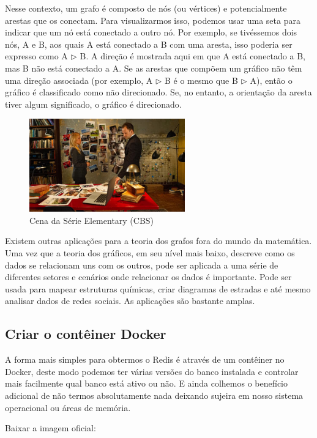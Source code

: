 \documentclass[a4paper,11pt]{article}
\begin{document}
Nesse contexto, um grafo é composto de nós (ou vértices) e potencialmente arestas que os conectam. Para visualizarmos isso, podemos usar uma seta para indicar que um nó está conectado a outro nó. Por exemplo, se tivéssemos dois nós, A e B, aos quais A está conectado a B com uma aresta, isso poderia ser expresso como A $\triangleright$ B. A direção é mostrada aqui em que A está conectado a B, mas B não está conectado a A. Se as arestas que compõem um gráfico não têm uma direção associada (por exemplo, A $\triangleright$ B é o mesmo que B $\triangleright$ A), então o gráfico é classificado como não direcionado. Se, no entanto, a orientação da aresta tiver algum significado, o gráfico é direcionado.
\begin{figure}[H]
	\centering
	\includegraphics[width=0.6\textwidth]{imagens/Elementary.jpg}
	\caption{Cena da Série Elementary (CBS)}
\end{figure}

Existem outras aplicações para a teoria dos grafos fora do mundo da matemática. Uma vez que a teoria dos gráficos, em seu nível mais baixo, descreve como os dados se relacionam uns com os outros, pode ser aplicada a uma série de diferentes setores e cenários onde relacionar os dados é importante. Pode ser usada para mapear estruturas químicas, criar diagramas de estradas e até mesmo analisar dados de redes sociais. As aplicações são bastante amplas. 

\subsection{Criar o contêiner Docker}
A forma mais simples para obtermos o Redis é através de um contêiner no Docker, deste modo podemos ter várias versões do banco instalada e controlar mais facilmente qual banco está ativo ou não. E ainda colhemos o benefício adicional de não termos absolutamente nada deixando sujeira em nosso sistema operacional ou áreas de memória.

Baixar a imagem oficial: \\
\end{document}
